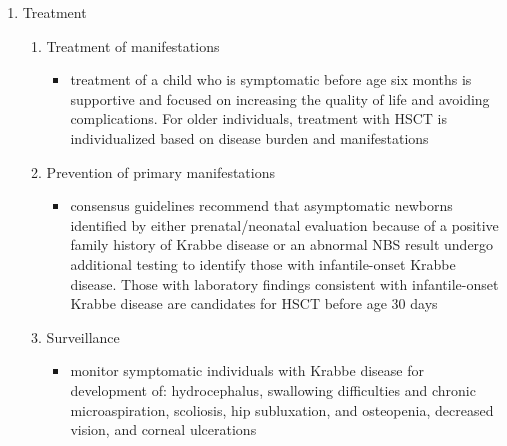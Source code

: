 \documentclass{scrartcl}
\begin{document}
\begin{enumerate}
\begin{enumerate}
\item Treatment
\label{sec:org8076cfe}
\begin{enumerate}
\item Treatment of manifestations
\label{sec:orgcbbdc3b}
\begin{itemize}
\item treatment of a child who is symptomatic before age six months is
supportive and focused on increasing the quality of life and
avoiding complications. For older individuals, treatment with HSCT
is individualized based on disease burden and manifestations
\end{itemize}

\item Prevention of primary manifestations
\label{sec:org747a908}
\begin{itemize}
\item consensus guidelines recommend that asymptomatic newborns
identified by either prenatal/neonatal evaluation because of a
positive family history of Krabbe disease or an abnormal NBS
result undergo additional testing to identify those with
infantile-onset Krabbe disease. Those with laboratory findings
consistent with infantile-onset Krabbe disease are candidates for
HSCT before age 30 days
\end{itemize}

\item Surveillance
\label{sec:orgd27befa}
\begin{itemize}
\item monitor symptomatic individuals with Krabbe disease for
development of: hydrocephalus, swallowing difficulties and chronic
microaspiration, scoliosis, hip subluxation, and osteopenia,
decreased vision, and corneal ulcerations
\end{itemize}
\end{enumerate}
\end{enumerate}
\end{enumerate}
\end{document}

